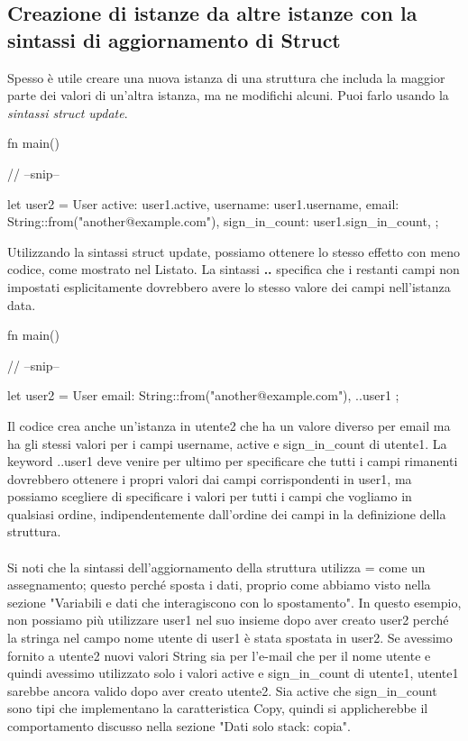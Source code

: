 \documentclass[11pt,a4paper]{article}
\begin{document}
\subsection{Creazione di istanze da altre istanze con la sintassi di aggiornamento di Struct}

Spesso è utile creare una nuova istanza di una struttura che includa la maggior parte dei valori di un'altra istanza, ma ne modifichi alcuni. Puoi farlo usando la \textit{sintassi struct update}.

\begin{rust}
fn main() {
    // --snip--

    let user2 = User {
        active: user1.active,
        username: user1.username,
        email: String::from("another@example.com"),
        sign_in_count: user1.sign_in_count,
    };
}
\end{rust}
Utilizzando la sintassi struct update, possiamo ottenere lo stesso effetto con meno codice, come mostrato nel Listato. La sintassi \textbf{..} specifica che i restanti campi non impostati esplicitamente dovrebbero avere lo stesso valore dei campi nell'istanza data.
\begin{rust}
fn main() {
    // --snip--

    let user2 = User {
        email: String::from("another@example.com"),
        ..user1
    };
}
\end{rust}

Il codice crea anche un'istanza in utente2 che ha un valore diverso per email ma ha gli stessi valori per i campi username, active e sign\_in\_count di utente1. La keyword ..user1 deve venire per ultimo per specificare che tutti i campi rimanenti dovrebbero ottenere i propri valori dai campi corrispondenti in user1, ma possiamo scegliere di specificare i valori per tutti i campi che vogliamo in qualsiasi ordine, indipendentemente dall'ordine dei campi in la definizione della struttura.\\
\\
Si noti che la sintassi dell'aggiornamento della struttura utilizza = come un assegnamento; questo perché sposta i dati, proprio come abbiamo visto nella sezione "Variabili e dati che interagiscono con lo spostamento". In questo esempio, non possiamo più utilizzare user1 nel suo insieme dopo aver creato user2 perché la stringa nel campo nome utente di user1 è stata spostata in user2. Se avessimo fornito a utente2 nuovi valori String sia per l'e-mail che per il nome utente e quindi avessimo utilizzato solo i valori active e sign\_in\_count di utente1, utente1 sarebbe ancora valido dopo aver creato utente2. Sia active che sign\_in\_count sono tipi che implementano la caratteristica Copy, quindi si applicherebbe il comportamento discusso nella sezione "Dati solo stack: copia".
\end{document}
